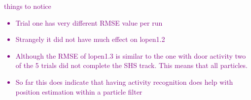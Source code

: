 \textcolor{purple}{
things to notice
\begin{itemize}
	\item Trial one has very different RMSE value per run
	\item Strangely it did not have much effect on lopen1.2
	\item Although the RMSE of lopen1.3 is similar to the one with door activity two of the 5 trials did not complete the SHS track. This means that all particles.
	\item So far this does indicate that having activity recognition does help with position estimation within a particle filter
\end{itemize}}
